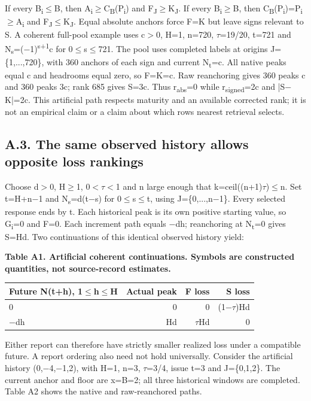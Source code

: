 \documentclass[10pt,a4paper]{article}
\begin{document}
If every B\textsubscript{i}\(\le\)B, then A\textsubscript{i}\(\ge\)C\textsubscript{B}(P\textsubscript{i}) and F\textsubscript{J}\(\ge\)K\textsubscript{J}. If every B\textsubscript{i}\(\ge\)B, then C\textsubscript{B}(P\textsubscript{i})=P\textsubscript{i}\(\ge\)A\textsubscript{i} and F\textsubscript{J}\(\le\)K\textsubscript{J}. Equal absolute anchors force F=K but leave signs relevant to S. A coherent full-pool example uses c\( > \)0, H=1, n=720, \(\tau\)=19/20, t=721 and N\textsubscript{s}=(\(-\)1)\textsuperscript{s+1}c for 0\(\le\)s\(\le\)721. The pool uses completed labels at origins J=\{1,...,720\}, with 360 anchors of each sign and current N\textsubscript{t}=c. All native peaks equal c and headrooms equal zero, so F=K=c. Raw reanchoring gives 360 peaks c and 360 peaks 3c; rank 685 gives S=3c. Thus r\textsubscript{abs}=0 while r\textsubscript{signed}=2c and |S\(-\)K|=2c. This artificial path respects maturity and an available corrected rank; it is not an empirical claim or a claim about which rows nearest retrieval selects.

\subsection*{A.3. The same observed history allows opposite loss rankings}
Choose d\( > \)0, H\(\ge\)1, 0\( < \)\(\tau\)\( < \)1 and n large enough that k=ceil((n+1)\(\tau\))\(\le\)n. Set t=H+n\(-\)1 and N\textsubscript{s}=d(t\(-\)s) for 0\(\le\)s\(\le\)t, using J=\{0,...,n\(-\)1\}. Every selected response ends by t. Each historical peak is its own positive starting value, so G\textsubscript{i}=0 and F=0. Each increment path equals \(-\)dh; reanchoring at N\textsubscript{t}=0 gives S=Hd. Two continuations of this identical observed history yield:

\begin{center}
\begin{minipage}{\linewidth}
\small\textbf{Table A1. Artificial coherent continuations. Symbols are constructed quantities, not source-record estimates.}\par\medskip
\centering\fontsize{8}{10}\selectfont
\begin{tabular}{lrrr}
\toprule
Future N(t+h), 1\(\le\)h\(\le\)H & Actual peak & F loss & S loss \\
\midrule
0 & 0 & 0 & (1\(-\)\(\tau\))Hd \\
\(-\)dh & Hd & \(\tau\)Hd & 0 \\
\bottomrule
\end{tabular}
\end{minipage}
\end{center}
Either report can therefore have strictly smaller realized loss under a compatible future. A report ordering also need not hold universally. Consider the artificial history (0,\(-\)4,\(-\)1,2), with H=1, n=3, \(\tau\)=3/4, issue t=3 and J=\{0,1,2\}. The current anchor and floor are x=B=2; all three historical windows are completed. Table A2 shows the native and raw-reanchored paths.
\end{document}
